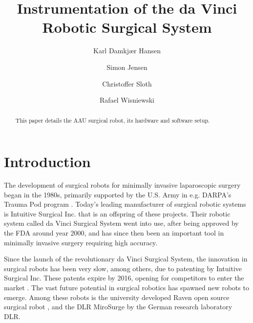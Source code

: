 \documentclass[a4paper, 11 pt, conference]{IEEEtran}  %
\title{\LARGE \bf Instrumentation of the da Vinci Robotic Surgical System}
\author{Karl Damkjær Hansen \and Simon Jensen \and Christoffer Sloth \and Rafael Wisniewski%
}
\begin{document}
\maketitle
\thispagestyle{empty}
\pagestyle{empty}
\begin{abstract}
This paper details the AAU surgical robot, its hardware and software setup.
\end{abstract}

\section{Introduction}
The development of surgical robots for minimally invasive laparoscopic surgery began in the 1980s, primarily supported by the U.S. Army in e.g. DARPA's Trauma Pod program \cite{ravenSpectrum}. Today's leading manufacturer of surgical robotic systems is Intuitive Surgical Inc. that is an offspring of these projects. Their robotic system called da Vinci Surgical System went into use, after being approved by the FDA around year 2000, and has since then been an important tool in minimally invasive surgery requiring high accuracy.



Since the launch of the revolutionary da Vinci Surgical System, the innovation in surgical robots has been very slow, among others, due to patenting by Intuitive Surgical Inc. These patents expire by 2016, opening for competitors to enter the market \cite{intuitivePatents}.
The vast future potential in surgical robotics has spawned new robots to emerge. Among these robots is the university developed Raven open source surgical robot \cite{ravenDesc}, and the DLR MiroSurge by the German research laboratory DLR.
\end{document}

